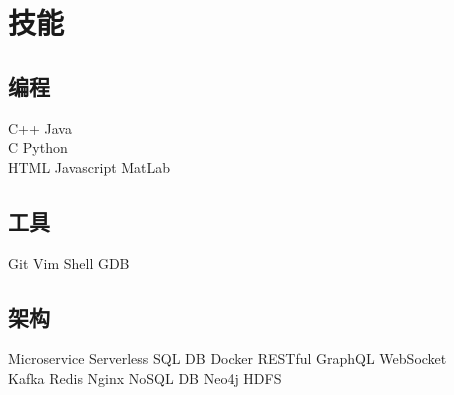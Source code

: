 \documentclass[]{deedy-resume-openfont}
\begin{document}
\begin{minipage}[t]{0.25\textwidth}

\section{技能}
\sectionsep
\subsection{编程}
C++ \textbullet{} Java \\
C \textbullet{} Python \\
HTML \textbullet{} Javascript \textbullet{} MatLab \\ 
\sectionsep

\subsection{工具}
Git \textbullet{} Vim \textbullet{} Shell \textbullet{} GDB \\
\sectionsep

\subsection{架构}
Microservice \textbullet{} Serverless \textbullet{} SQL DB
\textbullet{} Docker \textbullet{} RESTful \textbullet{}
GraphQL \textbullet WebSocket \\
Kafka \textbullet{} Redis \textbullet{} Nginx \textbullet NoSQL DB \textbullet{} Neo4j \textbullet HDFS
\sectionsep

%
%

\end{minipage} 
\hfill
\end{document}
